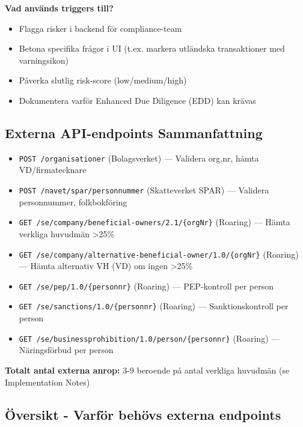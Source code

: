 \documentclass[12pt,a4paper]{article}
\begin{document}
\textbf{Vad används triggers till?}
\begin{itemize}[noitemsep]
  \item Flagga risker i backend för compliance-team
  \item Betona specifika frågor i UI (t.ex. markera utländska transaktioner med varningsikon)
  \item Påverka slutlig risk-score (low/medium/high)
  \item Dokumentera varför Enhanced Due Diligence (EDD) kan krävas
\end{itemize}

\subsection{Externa API-endpoints Sammanfattning}

\begin{itemize}[noitemsep]
  \item \texttt{POST /organisationer} (Bolagsverket) — Validera org.nr, hämta VD/firmatecknare
  \item \texttt{POST /navet/spar/personnummer} (Skatteverket SPAR) — Validera personnummer, folkbokföring
  \item \texttt{GET /se/company/beneficial-owners/2.1/\{orgNr\}} (Roaring) — Hämta verkliga huvudmän >25\%
  \item \texttt{GET /se/company/alternative-beneficial-owner/1.0/\{orgNr\}} (Roaring) — Hämta alternativ VH (VD) om ingen >25\%
  \item \texttt{GET /se/pep/1.0/\{personnr\}} (Roaring) — PEP-kontroll per person
  \item \texttt{GET /se/sanctions/1.0/\{personnr\}} (Roaring) — Sanktionskontroll per person
  \item \texttt{GET /se/businessprohibition/1.0/person/\{personnr\}} (Roaring) — Näringsförbud per person
\end{itemize}

\textbf{Totalt antal externa anrop:} 3-9 beroende på antal verkliga huvudmän (se Implementation Notes)

\subsection{Översikt - Varför behövs externa endpoints}
\end{document}

